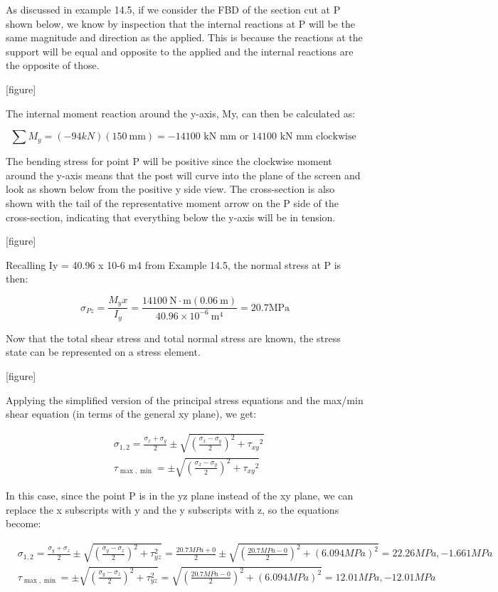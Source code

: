 \documentclass[
  letterpaper,
  DIV=11,
  numbers=noendperiod]{scrreprt}
\begin{document}
\begin{tcolorbox}
\begin{tcolorbox}
As discussed in example 14.5, if we consider the FBD of the section cut
at P shown below, we know by inspection that the internal reactions at P
will be the same magnitude and direction as the applied. This is because
the reactions at the support will be equal and opposite to the applied
and the internal reactions are the opposite of those.

{[}figure{]}

The internal moment reaction around the y-axis, My, can then be
calculated as:

\[
\sum M_y=(-94 kN)(150 \mathrm{~mm})=-14100 \text{ kN} \text{ mm} \text { or } 14100 \text{ kN} \text{ mm} \text { clockwise }
\]

The bending stress for point P will be positive since the clockwise
moment around the y-axis means that the post will curve into the plane
of the screen and look as shown below from the positive y side view. The
cross-section is also shown with the tail of the representative moment
arrow on the P side of the cross-section, indicating that everything
below the y-axis will be in tension.

{[}figure{]}

Recalling Iy = 40.96 x 10-6 m4 from Example 14.5, the normal stress at P
is then:

\[
\sigma_{P z}=\frac{M_y x}{I_y}=\frac{14100 \mathrm{~N} \cdot \mathrm{m}(0.06 \mathrm{~m})}{40.96 \times 10^{-6} \mathrm{~m}^4}=20.7 \mathrm{MPa}
\]

Now that the total shear stress and total normal stress are known, the
stress state can be represented on a stress element.

{[}figure{]}

Applying the simplified version of the principal stress equations and
the max/min shear equation (in terms of the general xy plane), we get:

\[
\begin{aligned}
& \sigma_{1,2}=\frac{\sigma_x+\sigma_y}{2} \pm \sqrt{\left(\frac{\sigma_x-\sigma_y}{2}\right)^2+\tau_{x y}{ }^2} \\
& \tau_{\max , \min }= \pm \sqrt{\left(\frac{\sigma_x-\sigma_y}{2}\right)^2+\tau_{x y}{ }^2}
\end{aligned}
\]

In this case, since the point P is in the yz plane instead of the xy
plane, we can replace the x subscripts with y and the y subscripts with
z, so the equations become:

\[
\begin{aligned}
& \sigma_{1,2}=\frac{\sigma_y+\sigma_z}{2} \pm \sqrt{\left(\frac{\sigma_y-\sigma_z}{2}\right)^2+\tau_{y z}^2}=\frac{20.7 M P a+0}{2} \pm \sqrt{\left(\frac{20.7 M P a-0}{2}\right)^2+(6.094 M P a)^2}=22.26 M P a,-1.661 M P a \\
& \tau_{\max , \min }= \pm \sqrt{\left(\frac{\sigma_y-\sigma_z}{2}\right)^2+\tau_{y z}^2}=\sqrt{\left(\frac{20.7 M P a-0}{2}\right)^2+(6.094 M P a)^2}=12.01 M P a,-12.01 M P a
\end{aligned}
\]


\end{tcolorbox}
\end{tcolorbox}
\end{document}
